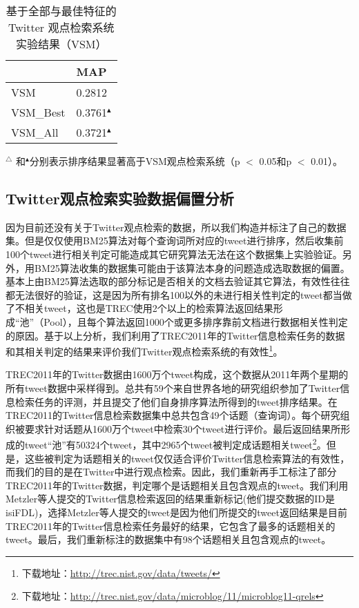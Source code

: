 \begin{table}
 \caption{基于全部与最佳特征的Twitter 观点检索系统实验结果（VSM）}
\label{bestVSM}
 \centering
 \begin{tabular}{|l l|}
 \hline
 & MAP \\
 \hline
VSM & 0.2812\\
VSM\_Best & 0.3761$^\blacktriangle$\\
VSM\_All & 0.3721$^\blacktriangle$\\
 \hline
 \end{tabular}
      \begin{tablenotes}
        \footnotesize
\item $^\triangle$ 和$^\blacktriangle$分别表示排序结果显著高于VSM观点检索系统（p $<$ 0.05和p $<$ 0.01）。
\end{tablenotes}
\end{table}

\subsection{Twitter观点检索实验数据偏置分析}
\label{TwitterBias}
因为目前还没有关于Twitter观点检索的数据，所以我们构造并标注了自己的数据集。但是仅仅使用BM25算法对每个查询词所对应的tweet进行排序，然后收集前100个tweet进行相关判定可能造成其它研究算法无法在这个数据集上实验验证。另外，用BM25算法收集的数据集可能由于该算法本身的问题造成选取数据的偏置。基本上由BM25算法选取的部分标记是否相关的文档去验证其它算法，有效性往往都无法很好的验证，这是因为所有排名100以外的未进行相关性判定的tweet都当做了不相关tweet，这也是TREC使用2个以上的检索算法返回结果形成“池”（Pool），且每个算法返回1000个或更多排序靠前文档进行数据相关性判定的原因。基于以上分析，我们利用了TREC2011年的Twitter信息检索任务的数据和其相关判定的结果来评价我们Twitter观点检索系统的有效性\footnote{下载地址：\url{http://trec.nist.gov/data/tweets/}}。

 TREC2011年的Twitter数据由1600万个tweet构成，这个数据从2011年两个星期的所有tweet数据中采样得到。总共有59个来自世界各地的研究组织参加了Twitter信息检索任务的评测，并且提交了他们自身排序算法所得到的tweet排序结果。在TREC2011的Twitter信息检索数据集中总共包含49个话题（查询词）。每个研究组织被要求针对话题从1600万个tweet中检索30个tweet进行评价。最后返回结果所形成的tweet“池”有50324个tweet，其中2965个tweet被判定成话题相关tweet\footnote{下载地址：\url{http://trec.nist.gov/data/microblog/11/microblog11-qrels}}。但是，这些被判定为话题相关的tweet仅仅适合评价Twitter信息检索算法的有效性，而我们的目的是在Twitter中进行观点检索。因此，我们重新再手工标注了部分 TREC2011年的Twitter数据，判定哪个是话题相关且包含观点的tweet。我们利用Metzler等人提交的Twitter信息检索返回的结果重新标记(他们提交数据的ID是isiFDL)，选择Metzler等人提交的tweet是因为他们所提交的tweet返回结果是目前 TREC2011年的Twitter信息检索任务最好的结果，它包含了最多的话题相关的tweet。最后，我们重新标注的数据集中有98个话题相关且包含观点的tweet。

